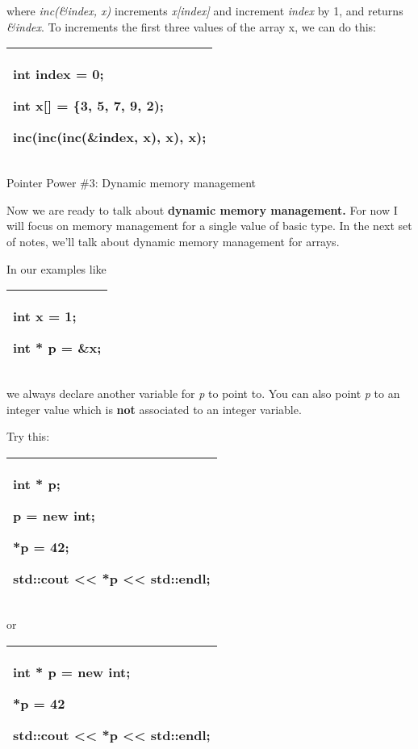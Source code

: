 \documentclass[
]{article}
\begin{document}
where \emph{inc(\&index, x)} increments \emph{x{[}index{]}} and
increment \emph{index} by 1, and returns \emph{\&index}. To increments
the first three values of the array x, we can do this:

\begin{longtable}[]{@{}l@{}}
\toprule
\endhead
\begin{minipage}[t]{0.97\columnwidth}\raggedright
int index = 0;

int x{[}{]} = \{3, 5, 7, 9, 2);

inc(inc(inc(\&index, x), x), x); \strut
\end{minipage}\tabularnewline
\bottomrule
\end{longtable}

Pointer Power \#3: Dynamic memory management

Now we are ready to talk about \textbf{dynamic memory management. }For
now I will focus on memory management for a single value of basic type.
In the next set of notes, we'll talk about dynamic memory management for
arrays.

In our examples like

\begin{longtable}[]{@{}l@{}}
\toprule
\endhead
\begin{minipage}[t]{0.97\columnwidth}\raggedright
int x = 1;

int * p = \&x;\strut
\end{minipage}\tabularnewline
\bottomrule
\end{longtable}

we always declare another variable for \emph{p} to point to. You can
also point \emph{p} to an integer value which is \textbf{not} associated
to an integer variable.

Try this:

\begin{longtable}[]{@{}l@{}}
\toprule
\endhead
\begin{minipage}[t]{0.97\columnwidth}\raggedright
int * p;

p = \textbf{new int};

*p = 42;

std::cout \textless\textless{} *p \textless\textless{} std::endl;\strut
\end{minipage}\tabularnewline
\bottomrule
\end{longtable}

or

\begin{longtable}[]{@{}l@{}}
\toprule
\endhead
\begin{minipage}[t]{0.97\columnwidth}\raggedright
int * p = \textbf{new int};

*p = 42

std::cout \textless\textless{} *p \textless\textless{} std::endl;\strut
\end{minipage}\tabularnewline
\bottomrule
\end{longtable}
\end{document}
